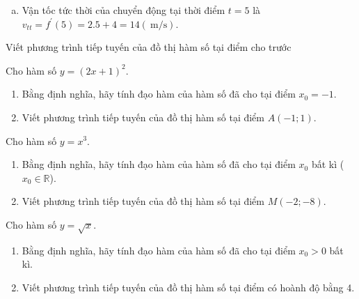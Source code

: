\begin{bt}
\begin{vd}
{\begin{enumerate}[a)]
	Vậy $f^{\prime}\left(t_0\right)=2 t_0+4$.
	\item Vận tốc tức thời của chuyển động tại thời điểm $t=5$ là $v_{t t}=f^{\prime}(5)=2.5+4=14(\mathrm{~m} / \mathrm{s})$.
\end{enumerate}
}
\end{vd}

\begin{dang}{Viết phương trình tiếp tuyến của đồ thị hàm số tại điểm cho trước}
\end{dang}


\begin{vd}%
	Cho hàm số $y=(2 x+1)^2$.
	\begin{enumerate}
		\item  Bằng định nghĩa, hãy tính đạo hàm của hàm số đã cho tại điểm $x_0=-1$.
		\item  Viết phương trình tiếp tuyến của đồ thị hàm số tại điểm $A(-1 ; 1)$.
	\end{enumerate}
	
\end{vd}%

\begin{vd}%
	Cho hàm số $y=x^3$.
	\begin{enumerate}
		\item  Bằng định nghĩa, hãy tính đạo hàm của hàm số đã cho tại điểm $x_0$ bất kì ($x_0 \in \mathbb{R}$).
		\item  Viết phương trình tiếp tuyến của đồ thị hàm số tại điểm $M(-2;-8)$.
	\end{enumerate}
	\loigiai{
	}
\end{vd}%

\begin{vd}%
	Cho hàm số $y=\sqrt{x}$.
	\begin{enumerate}
		\item  Bằng định nghĩa, hãy tính đạo hàm của hàm số đã cho tại điểm $x_0>0$ bất kì.
		\item  Viết phương trình tiếp tuyến của đồ thị hàm số tại điểm có hoành độ bằng 4.
	\end{enumerate}
	\loigiai{
	}
\end{vd}%


\end{bt}
